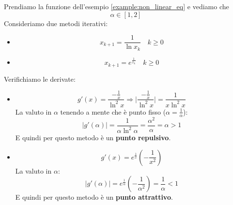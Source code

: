 \newpage
\begin{example}
	Prendiamo la funzione dell'esempio \ref{example:non_linear_eq} e vediamo che
	\begin{equation*}
		\alpha \in [1,2]
	\end{equation*}
	Consideriamo due metodi iterativi:
	\begin{itemize}
		\item
		\begin{equation*}
			x_{k+1} = \frac{1}{\ln {x_k}} \quad k \geq 0
		\end{equation*}
		\item 
		\begin{equation*}
			x_{k+1} = e^{\frac{1}{x_k}} \quad k \geq 0
		\end{equation*}
	\end{itemize}
	Verifichiamo le derivate:
	\begin{itemize}
		\item 
		\begin{equation*}
			g'(x) = \frac{- \frac{1}{x}}{\ln ^ 2 {x}} \Rightarrow \lvert \frac{- \frac{1}{x}}{\ln ^ 2 {x}} \rvert  = \frac{1}{x \ln^2 x}
		\end{equation*}
		La valuto in $\alpha$ tenendo a mente che è punto fisso ($\alpha = \frac{1}{\alpha}$):
		\begin{equation*}
			\lvert g'(\alpha)\rvert = \frac{1}{\alpha \ln ^2 \alpha} = \frac{\alpha^2}{\alpha} = \alpha > 1
		\end{equation*}
		E quindi per questo metodo è un \textbf{punto repulsivo}.
		\item \begin{equation*}
			g'(x) = e^\frac{1}{x}(-\frac{1}{x^2})
		\end{equation*}
		La valuto in $\alpha$:
		\begin{equation*}
			\lvert g'(\alpha) \rvert = e^\frac{1}{\alpha}(-\frac{1}{\alpha^2}) = \frac{1}{\alpha} < 1
		\end{equation*}
		E quindi per questo metodo è un \textbf{punto attrattivo}.
	\end{itemize}
\end{example}

